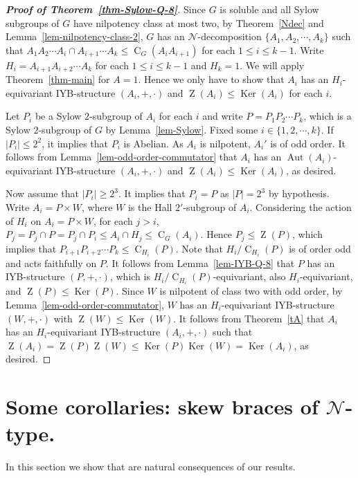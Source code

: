 \documentclass[12pt,a4paper]{article}
\DeclareMathOperator{\C}{C}
\DeclareMathOperator{\Z}{Z}
\DeclareMathOperator{\Ker}{Ker}
\DeclareMathOperator{\Aut}{Aut}
\theoremstyle{definition}
\begin{document}
\begin{proof}[\textbf{\emph{Proof of Theorem~\ref{thm-Sylow-Q-8}}}]
Since $G$ is soluble and all Sylow subgroups of $G$ have nilpotency class at most two, by Theorem~\ref{Ndec} and Lemma~\ref{lem-nilpotency-class-2}, $G$ has an $\mathcal{N}$-decomposition $\{A_1,A_2,\cdots,A_k\}$ such that
$A_1A_2\cdots A_i \cap A_{i+1}\cdots A_k \leq \C_G(A_iA_{i+1})$ for each $1\leq i \leq k-1$.
Write $H_i=A_{i+1}A_{i+2} \cdots A_k$ for each $1 \leq i \leq k-1$ and $H_k=1$.
We will apply Theorem~\ref{thm-main} for $A=1$. Hence we only have to show that $A_i$ has an $H_i$-equivariant IYB-structure $(A_i,+, \cdot)$ and $\Z(A_i) \leq \Ker(A_i)$ for each $i$.

Let $P_i$ be a Sylow $2$-subgroup of $A_i$ for each $i$ and write $P=P_1P_2\cdots P_k$, which is a
Sylow $2$-subgroup of $G$ by Lemma~\ref{lem-Sylow}.  Fixed some $i \in \{1,2,\cdots,k\}$. If $|P_i| \leq 2^2$, it implies that $P_i$ is Abelian. As $A_i$ is nilpotent, $A_i'$ is of odd order. It follows from Lemma~\ref{lem-odd-order-commutator} that $A_i$ has an $\Aut(A_i)$-equivariant IYB-structure $(A_i,+, \cdot)$ and $\Z(A_i) \leq \Ker(A_i)$, as desired.

Now assume that $|P_i| \geq 2^3$. It implies that $P_i=P$ as $|P|=2^3$ by hypothesis. Write $A_i=P \times W$, where $W$ is the Hall $2'$-subgroup of $A_i$. Considering the action of $H_i$ on $A_i=P \times W $, for each $j>i$, $P_j=P_j \cap P=P_j \cap P_i \leq A_i \cap H_j \leq \C_G(A_i)$. Hence $P_j \leq \Z(P)$, which implies that $P_{i+1}P_{i+2} \cdots P_k \leq \C_{H_i}(P)$. Note that $H_i/\C_{H_i}(P)$ is of order odd and acts faithfully on $P$. It follows from Lemma~\ref{lem-IYB-Q-8} that $P$ has an IYB-structure $(P,+,\cdot)$, which is $H_i/\C_{H_i}(P)$-equivariant, also $H_i$-equivariant, and $\Z(P) \leq \Ker(P)$.
Since $W$ is nilpotent of class two with odd order, by Lemma~\ref{lem-odd-order-commutator}, $W$ has an $H_i$-equivariant IYB-structure $(W,+,\cdot)$ with $\Z(W) \leq \Ker(W)$. It follows from Theorem~\ref{tA} that
$A_i$ has an $H_i$-equivariant IYB-structure $(A_i,+,\cdot)$ such that $\Z(A_i)=\Z(P)\Z(W) \leq \Ker(P)\Ker(W)=\Ker(A_i)$, as desired.
\end{proof}

\section{Some corollaries: skew braces of $\mathcal{N}$-type.}

In this section we show that \cite[Theorem~3.2,Theorem~3.5 ]{CedoOkninski2025} are natural consequences of our results. 
\end{document}
